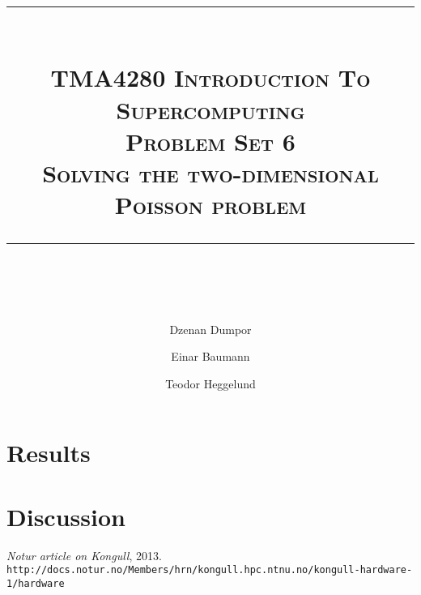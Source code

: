 




\author{Dzenan Dumpor \and Einar Baumann \and Teodor Heggelund}
\title{
    \vspace{-1in}
    \vspace{0.1in}
    \rule{\textwidth}{0.5pt} \\[0.5cm]
    \normalfont \normalsize \textsc{TMA4280 Introduction To Supercomputing} \\ [20pt]
    {\textsc{ \huge Problem Set 6 }} \\ [0.5cm]
    {\textsc {\Large Solving the two-dimensional Poisson problem} } \\
    \vspace{0.1in}
    \rule{\textwidth}{2pt} \\[0.7cm]
}


\maketitle
\thispagestyle{empty}
\clearpage

\tableofcontents



\section{Results}
 \clearpage
 \clearpage
 \clearpage
 \clearpage

\section{Discussion}
 \clearpage
 \clearpage
 \clearpage



\clearpage
\begin{thebibliography}{2}
   {\em Notur article on Kongull}, 2013. \\ \texttt{http://docs.notur.no/Members/hrn/kongull.hpc.ntnu.no/kongull-hardware-1/hardware}
\end{thebibliography}

\clearpage
\appendix






